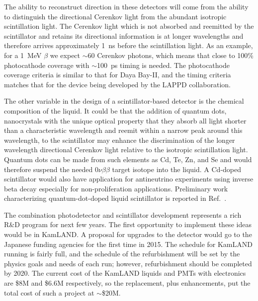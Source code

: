\documentclass[11pt]{article}
\begin{document}
The ability to reconstruct direction in these detectors will come from the ability to distinguish the directional Cerenkov light from the abundant isotropic scintillation light. The Cerenkov light which is not absorbed and reemitted by the scintillator and retains its directional information is at longer wavelengths and therefore arrives approximately 1~ns before the scintillation light. As an example, for a 1~MeV $\beta$ we expect $\sim$60 Cerenkov photons, which means that close to 100\% photocathode coverage with $\sim$100~ps timing is needed. The photocathode coverage criteria is similar to that for Daya Bay-II\cite{dayabayII}, and the timing criteria matches that for the device being developed by the LAPPD collaboration\cite{LAPPDSum,LAPPDTDR}.

The other variable in the design of a scintillator-based detector is the chemical composition of the liquid. It could be that the addition of quantum dots, nanocrystals with the unique optical property that they absorb all light shorter than a characteristic wavelength and reemit within a narrow peak around this wavelength, to the scintillator may enhance the discrimination of the longer wavelength directional Cerenkov light relative to the isotropic scintillation light.  Quantum dots can be made from such elements as Cd, Te, Zn, and Se and would therefore suspend the needed $0\nu\beta\beta$ target isotope into the liquid. A Cd-doped scintillator would also have application for antineutrino experiments using inverse beta decay especially for non-proliferation applications. Preliminary work characterizing quantum-dot-doped liquid scintillator is reported in Ref.~\cite{qdot}.

The combination photodetector and scintillator development represents a rich R\&D program for next few years. The first opportunity to implement these ideas would be in KamLAND. A proposal for upgrades to the detector would go to the Japanese funding agencies for the first time in 2015. The schedule for KamLAND running is fairly full, and the schedule of the refurbishment will be set by the physics goals and needs of each run; however, refurbishment should be completed by 2020. The current cost of the KamLAND liquids and PMTs with electronics are \$8M and \$6.6M respectively, so the replacement, plus enhancements, put the total cost of such a project at $\sim$\$20M. 
 
\end{document}
